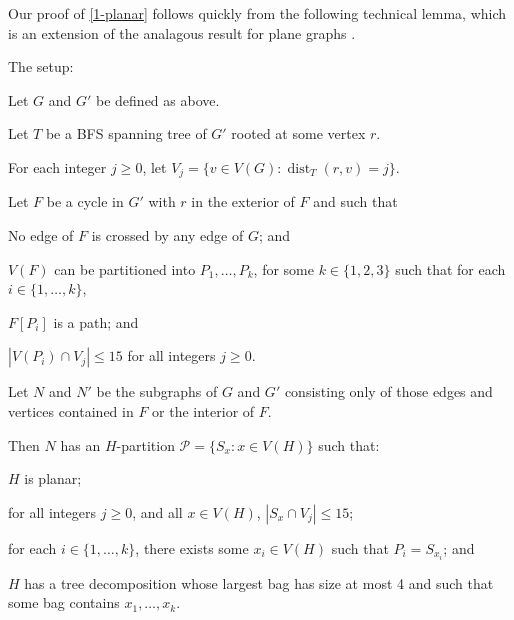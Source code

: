 \documentclass{patmorin}
\DeclareMathOperator{\dist}{dist}
\renewcommand{\ge}{\geqslant}
\renewcommand{\le}{\leqslant}
\begin{document}
Our proof of \cref{1-planar} follows quickly from the following technical lemma, which is an extension of the analagous result for plane graphs \cite{dujmovic.joret.ea:planar}.
\begin{lem}
\label{induction} The setup:
  \begin{compactenum}
    \item Let $G$ and $G'$ be defined as above.
    \item Let $T$ be a BFS spanning tree of $G'$ rooted at some vertex $r$.
    \item For each integer $j\ge 0$, let $V_j=\{v\in V(G):\dist_T(r,v)=j\}$. 
    \item Let $F$ be a cycle in $G'$ with $r$ in the exterior of $F$ and such that
    \begin{compactenum} 
      \item No edge of $F$ is crossed by any edge of $G$; and
      \item $V(F)$ can be partitioned into $P_1,\ldots,P_k$, for some $k\in\{1,2,3\}$ such that for each $i\in\{1,\ldots,k\}$,
      \begin{compactenum}
        \item $F[P_i]$ is a path; and
        \item $|V(P_i)\cap V_j| \le 15$ for all integers $j\ge 0$.
      \end{compactenum}
    \end{compactenum}
    \item Let $N$ and $N'$ be the subgraphs of $G$ and $G'$ consisting only of those edges and vertices contained in $F$ or the interior of $F$.
  \end{compactenum}
  Then $N$ has an $H$-partition $\mathcal{P}=\{S_x : x\in V(H)\}$ such that:
  \begin{compactenum}
    \item $H$ is planar;
    \item for all integers $j\ge 0$, and all $x\in V(H)$, $|S_x\cap V_j|\le 15$; 
    \item for each $i\in\{1,\ldots,k\}$, there exists some $x_i\in V(H)$ such that $P_i=S_{x_i}$; and
    \item $H$ has a tree decomposition whose largest bag has size at most 4 and such that some bag contains $x_1,\ldots,x_k$.
  \end{compactenum}
\end{lem}
\end{document}
